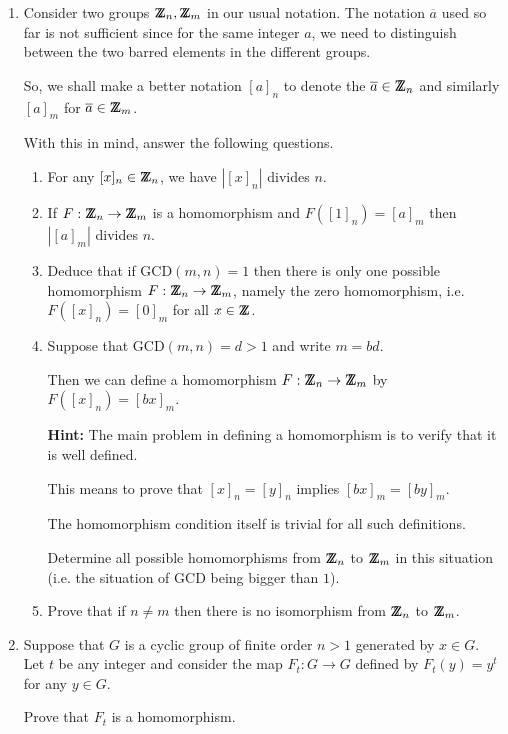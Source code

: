 \documentclass[12pt]{article}
\def\DZ{ \mbox{\rm Z \kern -0.75em Z} }
\begin{document}
\begin{enumerate}
\item Consider two groups $\DZ_n,\DZ_m$ in our usual notation.
The notation $\overline{a}$ used so far is not sufficient since for the
same integer $a$, we need to distinguish between the two barred elements
in the different groups.

So, we shall make a better notation $[a]_n$ to denote the
$\overline{a}\in \DZ_n$ and similarly $[a]_m$ for $\overline{a}\in
\DZ_m$.

With this in mind, answer the following questions.
\begin{enumerate}
\item For any $[x]_n\in \DZ_n$, we have $|[x]_n|$ divides $n$.

\item If $F:\DZ_n\rightarrow \DZ_m$ is a homomorphism and $F([1]_n) = [a]_m$ then
$|[a]_m|$ divides $n$.

\item Deduce that if $\mbox{GCD}(m,n)=1$ then there is only one possible
homomorphism
$F:\DZ_n\rightarrow \DZ_m$, namely the zero homomorphism, i.e.
$F([x]_n)=[0]_m$ for all $x\in \DZ$.

\item Suppose that  $\mbox{GCD}(m,n)=d>1$ and write $m=bd$.

Then we can define a homomorphism
$F:\DZ_n\rightarrow \DZ_m$ by  $F([x]_n)=[bx]_m$.

{\bf Hint:} The main problem in defining a homomorphism is to verify
that it is well defined.

This means to prove that $[x]_n=[y]_n$ implies $[bx]_m=[by]_m$.

The homomorphism condition itself is trivial for all such definitions.

Determine all possible homomorphisms from $\DZ_n$ to $\DZ_m$ in this
situation (i.e. the situation of  GCD being bigger than $1$).

\item Prove that if $n\neq m$ then there is no isomorphism from $\DZ_n$
to $\DZ_m$.
\end{enumerate}

\item Suppose that $G$ is a cyclic group of finite order $n>1$ generated by $x\in
G$.
Let $t$ be any integer and consider the map $F_t:G\rightarrow G$ defined
by $F_t(y)=y^t$ for any $y\in G$.

Prove that $F_t$ is a homomorphism.


\end{enumerate}
\end{document}
